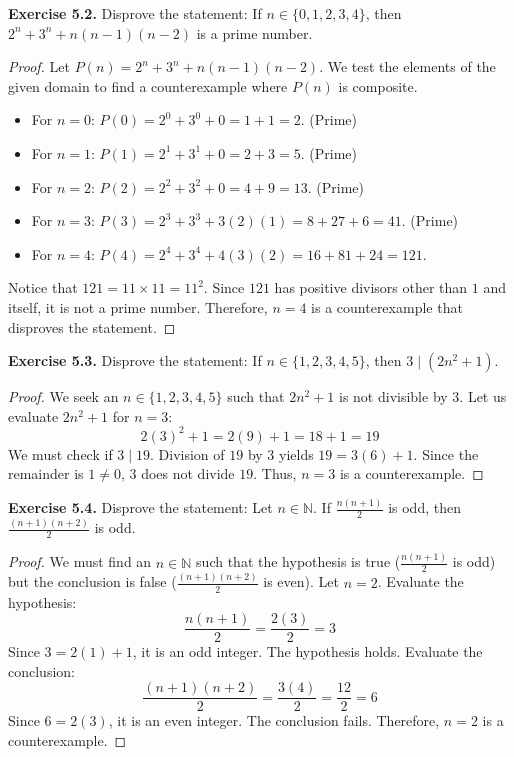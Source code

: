 \documentclass[11pt, letterpaper]{article}
\theoremstyle{remark}
\newcommand{\N}{\mathbb{N}}
\begin{document}
\textbf{Exercise 5.2.} Disprove the statement: If $n \in \{0, 1, 2, 3, 4\}$, then $2^n + 3^n + n(n-1)(n-2)$ is a prime number.
\begin{proof}
Let $P(n) = 2^n + 3^n + n(n-1)(n-2)$. We test the elements of the given domain to find a counterexample where $P(n)$ is composite.
\begin{itemize}
    \item For $n = 0$: $P(0) = 2^0 + 3^0 + 0 = 1 + 1 = 2$. (Prime)
    \item For $n = 1$: $P(1) = 2^1 + 3^1 + 0 = 2 + 3 = 5$. (Prime)
    \item For $n = 2$: $P(2) = 2^2 + 3^2 + 0 = 4 + 9 = 13$. (Prime)
    \item For $n = 3$: $P(3) = 2^3 + 3^3 + 3(2)(1) = 8 + 27 + 6 = 41$. (Prime)
    \item For $n = 4$: $P(4) = 2^4 + 3^4 + 4(3)(2) = 16 + 81 + 24 = 121$.
\end{itemize}
Notice that $121 = 11 \times 11 = 11^2$. Since $121$ has positive divisors other than $1$ and itself, it is not a prime number. Therefore, $n = 4$ is a counterexample that disproves the statement.
\end{proof}

\textbf{Exercise 5.3.} Disprove the statement: If $n \in \{1, 2, 3, 4, 5\}$, then $3 \mid (2n^2 + 1)$.
\begin{proof}
We seek an $n \in \{1, 2, 3, 4, 5\}$ such that $2n^2 + 1$ is not divisible by $3$.
Let us evaluate $2n^2 + 1$ for $n = 3$:
\[ 2(3)^2 + 1 = 2(9) + 1 = 18 + 1 = 19 \]
We must check if $3 \mid 19$. Division of $19$ by $3$ yields $19 = 3(6) + 1$. Since the remainder is $1 \neq 0$, $3$ does not divide $19$.
Thus, $n = 3$ is a counterexample.
\end{proof}

\textbf{Exercise 5.4.} Disprove the statement: Let $n \in \N$. If $\frac{n(n+1)}{2}$ is odd, then $\frac{(n+1)(n+2)}{2}$ is odd.
\begin{proof}
We must find an $n \in \N$ such that the hypothesis is true ($\frac{n(n+1)}{2}$ is odd) but the conclusion is false ($\frac{(n+1)(n+2)}{2}$ is even).
Let $n = 2$.
Evaluate the hypothesis:
\[ \frac{n(n+1)}{2} = \frac{2(3)}{2} = 3 \]
Since $3 = 2(1) + 1$, it is an odd integer. The hypothesis holds.
Evaluate the conclusion:
\[ \frac{(n+1)(n+2)}{2} = \frac{3(4)}{2} = \frac{12}{2} = 6 \]
Since $6 = 2(3)$, it is an even integer. The conclusion fails.
Therefore, $n = 2$ is a counterexample.
\end{proof}
\end{document}
